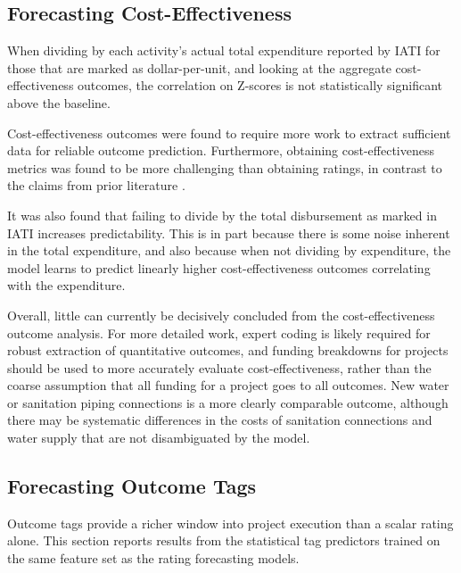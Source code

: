 \FloatBarrier
\subsection{Forecasting Cost-Effectiveness}
When dividing by each activity's actual total expenditure reported by IATI for those that are marked as dollar-per-unit, and looking at the aggregate cost-effectiveness outcomes, the correlation on Z-scores is not statistically significant above the baseline.

Cost-effectiveness outcomes were found to require more work to extract sufficient data for reliable outcome prediction. Furthermore, obtaining cost-effectiveness metrics was found to be more challenging than obtaining ratings, in contrast to the claims from prior literature \citep{goldembergMindingGapAid2025}. 

It was also found that failing to divide by the total disbursement as marked in IATI increases predictability. This is in part because there is some noise inherent in the total expenditure, and also because when not dividing by expenditure, the model learns to predict linearly higher cost-effectiveness outcomes correlating with the expenditure. 

Overall, little can currently be decisively concluded from the cost-effectiveness outcome analysis. For more detailed work, expert coding is likely required for robust extraction of quantitative outcomes, and funding breakdowns for projects should be used to more accurately evaluate cost-effectiveness, rather than the coarse assumption that all funding for a project goes to all outcomes. New water or sanitation piping connections is a more clearly comparable outcome, although there may be systematic differences in the costs of sanitation connections and water supply that are not disambiguated by the model.

\FloatBarrier

\subsection{Forecasting Outcome Tags}
\label{sec:outcome_tags_results}

Outcome tags provide a richer window into project execution than a scalar rating alone. This section reports results from the statistical tag predictors trained on the same feature set as the rating forecasting models.

